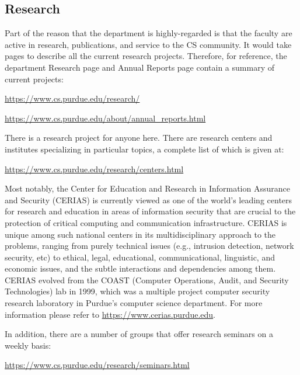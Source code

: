 \subsection{Research}

Part of the reason that the department is highly-regarded is that the faculty are active in research, publications, and service to the CS community. It would take pages to describe all the current research projects. Therefore, for reference, the department Research page and Annual Reports page contain a summary of current projects:

\centerline{\url{https://www.cs.purdue.edu/research/}}
\vspace{\baselineskip}
\centerline{\url{https://www.cs.purdue.edu/about/annual_reports.html}}
\vspace{\baselineskip}

There is a research project for anyone here. There are research centers and institutes specializing in particular topics, a complete list of which is given at:

\centerline{\url{https://www.cs.purdue.edu/research/centers.html}}
\vspace{\baselineskip}

Most notably, the Center for Education and Research in Information Assurance and Security (CERIAS) is currently viewed as one of the world's leading centers for research and education in areas of information security that are crucial to the protection of critical computing and communication infrastructure. CERIAS is unique among such national centers in its multidisciplinary approach to the problems, ranging from purely technical issues (e.g., intrusion detection, network security, etc) to ethical, legal, educational, communicational, linguistic, and economic issues, and the subtle interactions and dependencies among them. CERIAS evolved from the COAST (Computer Operations, Audit, and Security Technologies) lab in 1999, which was a multiple project computer security research laboratory in Purdue's computer science department. For more information please refer to \url{https://www.cerias.purdue.edu}.

In addition, there are a number of groups that offer research seminars on a weekly basis:

\centerline{\url{https://www.cs.purdue.edu/research/seminars.html}}
\vspace{\baselineskip}